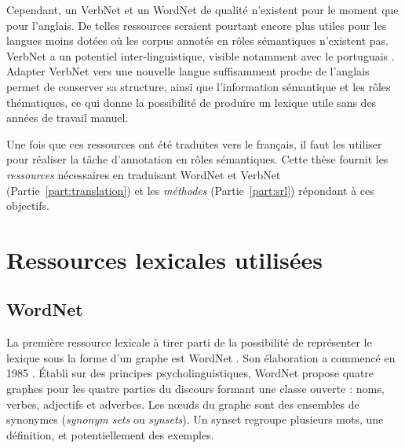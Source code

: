 Cependant, un VerbNet et un WordNet de qualité n'existent pour le moment que
pour l'anglais. De telles ressources seraient pourtant encore plus utiles pour
les langues moins dotées où les corpus annotés en rôles sémantiques n'existent
pas. VerbNet a un potentiel inter-linguistique, visible notamment avec le
portuguais \citep[section 2.2.2]{kipperschuler2005verbnet}. Adapter VerbNet
vers une nouvelle langue suffisamment proche de l'anglais permet de conserver
sa structure, ainsi que l'information sémantique et les rôles thématiques, ce
qui donne la possibilité de produire un lexique utile sans des années de
travail manuel.

Une fois que ces ressources ont été traduites vers le français, il faut les
utiliser pour réaliser la tâche d'annotation en rôles sémantiques. Cette thèse
fournit les \emph{ressources} nécessaires en traduisant WordNet et VerbNet
(Partie~\ref{part:translation}) et les \emph{méthodes} (Partie~\ref{part:srl})
répondant à ces objectifs.

\section{Ressources lexicales utilisées}
\label{ressources_utilisees}

\subsection{WordNet}
\label{presentation_wordnet}

La première ressource lexicale à tirer parti de la possibilité de représenter
le lexique sous la forme d'un graphe est WordNet \citep{fellbaum1998wordnet}.
Son élaboration a commencé en 1985 \citep{miller1990introduction}. Établi sur
des principes psycholinguistiques, WordNet propose quatre graphes pour les
quatre parties du discours formant une classe ouverte : noms, verbes,
adjectifs et adverbes. Les nœuds du graphe sont des ensembles de synonymes
(\emph{synonym sets} ou \emph{synsets}). Un synset regroupe plusieurs mots, une
définition, et potentiellement des exemples.

